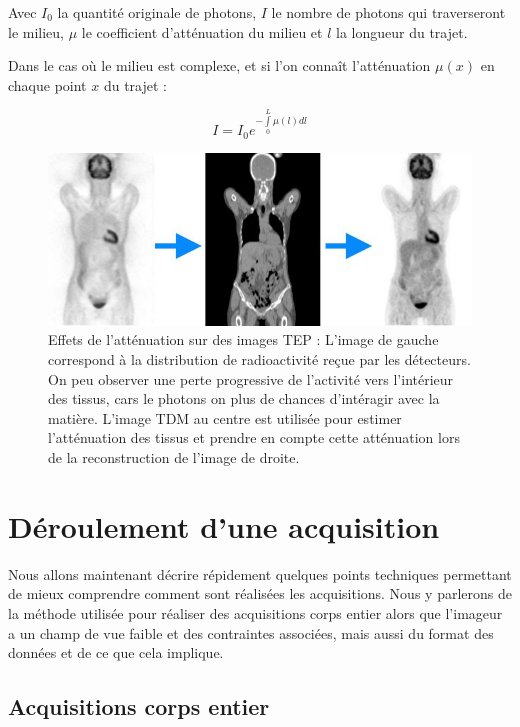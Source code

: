 Avec $I_0$ la quantité originale de photons, $I$ le nombre de photons qui traverseront le milieu, $\mu$ le coefficient d'atténuation du milieu et $l$ la longueur du trajet. 

Dans le cas où le milieu est complexe, et si l'on connaît l'atténuation $\mu(x)$ en chaque point $x$ du trajet :

\begin{equation}
I = I_0 e^{- \int\limits^L_0 \mu(l) dl}
\end{equation}



\begin{figure}
\centering
\includegraphics[width=12cm]{images/attenuationNonAtt}
\caption[Effet de l'atténuation sur les images TEP]{Effets de l'atténuation sur des images TEP : L'image de gauche correspond à la distribution de radioactivité reçue par les détecteurs. On peu observer une perte progressive de l'activité vers l'intérieur des tissus, cars le photons on plus de chances d'intéragir avec la matière. L'image TDM au centre est utilisée pour estimer l'atténuation des tissus et prendre en compte cette atténuation lors de la reconstruction de l'image de droite.}
\label{fig:schemaAtt}
\end{figure}


\chapter{Déroulement d'une acquisition}

Nous allons maintenant décrire répidement quelques points techniques permettant de mieux comprendre comment sont réalisées les acquisitions. Nous y parlerons de la méthode utilisée pour réaliser des acquisitions corps entier alors que l'imageur a un champ de vue faible et des contraintes associées, mais aussi du format des données et de ce que cela implique.

	\section{Acquisitions corps entier}


